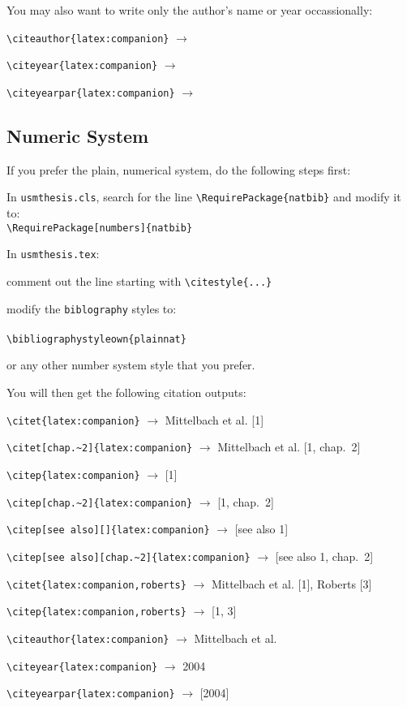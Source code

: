 You may also want to write only the author's name or year occassionally:

\begin{compactitem}
\item \verb|\citeauthor{latex:companion}| $\to$ \citeauthor{latex:companion}
\item \verb|\citeyear{latex:companion}| $\to$ \citeyear{latex:companion}
\item \verb|\citeyearpar{latex:companion}| $\to$ \citeyearpar{latex:companion}\end{compactitem}

\subsection{Numeric System}

If you prefer the plain, numerical system, do the following steps first:
\begin{compactenum}
  \item In \texttt{usmthesis.cls}, search for the line \verb|\RequirePackage{natbib}| and modify it to:\\
  \verb|\RequirePackage[numbers]{natbib}|
  \item In \texttt{usmthesis.tex}:
  \begin{compactitem}
    \item comment out the line starting with \verb|\citestyle{...}|
    \item modify the \verb|biblography| styles to: \\
      \verb|| \\
      \verb|\bibliographystyleown{plainnat}|
    \end{compactitem}
    or any other number system style that you prefer.
\end{compactenum}

You will then get the following citation outputs: 


\begin{compactitem}
\item \verb|\citet{latex:companion}| $\to$ Mittelbach et al. [1]
\item \verb|\citet[chap.~2]{latex:companion}| $\to$ Mittelbach et al. [1, chap.~2]
\item \verb|\citep{latex:companion}| $\to$ [1]
\item \verb|\citep[chap.~2]{latex:companion}| $\to$ [1, chap.~2]
\item \verb|\citep[see also][]{latex:companion}| $\to$ [see also 1]
\item \verb|\citep[see also][chap.~2]{latex:companion}| $\to$ [see also 1, chap.~2]
\item \verb|\citet{latex:companion,roberts}| $\to$ Mittelbach et al. [1], Roberts [3]
\item \verb|\citep{latex:companion,roberts}| $\to$ [1, 3]
\item \verb|\citeauthor{latex:companion}| $\to$ Mittelbach et al.
\item \verb|\citeyear{latex:companion}| $\to$ 2004
\item \verb|\citeyearpar{latex:companion}| $\to$ [2004]
\end{compactitem}
